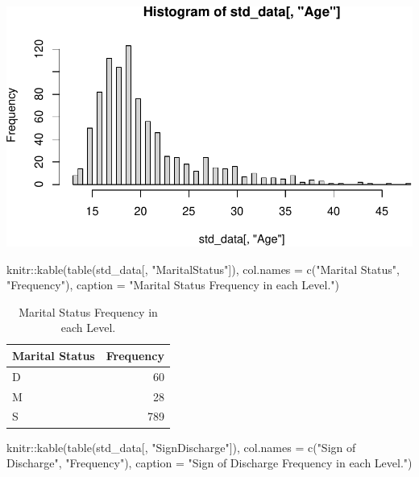 \documentclass[
]{article}
\newenvironment{Shaded}{\begin{snugshade}}{\end{snugshade}}
\newcommand{\AttributeTok}[1]{\textcolor[rgb]{0.77,0.63,0.00}{#1}}
\newcommand{\FunctionTok}[1]{\textcolor[rgb]{0.00,0.00,0.00}{#1}}
\newcommand{\NormalTok}[1]{#1}
\newcommand{\SpecialCharTok}[1]{\textcolor[rgb]{0.00,0.00,0.00}{#1}}
\newcommand{\StringTok}[1]{\textcolor[rgb]{0.31,0.60,0.02}{#1}}
\begin{document}
\includegraphics{practical_files/figure-latex/unnamed-chunk-4-1.pdf}

\begin{Shaded}
\begin{Highlighting}[]
\NormalTok{knitr}\SpecialCharTok{::}\FunctionTok{kable}\NormalTok{(}\FunctionTok{table}\NormalTok{(std\_data[, }\StringTok{"MaritalStatus"}\NormalTok{]), }\AttributeTok{col.names =} \FunctionTok{c}\NormalTok{(}\StringTok{"Marital Status"}\NormalTok{, }\StringTok{"Frequency"}\NormalTok{), }\AttributeTok{caption =} \StringTok{"Marital Status Frequency in each Level."}\NormalTok{)}
\end{Highlighting}
\end{Shaded}

\begin{table}

\caption{\label{tab:unnamed-chunk-5}Marital Status Frequency in each Level.}
\centering
\begin{tabular}[t]{l|r}
\hline
Marital Status & Frequency\\
\hline
D & 60\\
\hline
M & 28\\
\hline
S & 789\\
\hline
\end{tabular}
\end{table}

\begin{Shaded}
\begin{Highlighting}[]
\NormalTok{knitr}\SpecialCharTok{::}\FunctionTok{kable}\NormalTok{(}\FunctionTok{table}\NormalTok{(std\_data[, }\StringTok{"SignDischarge"}\NormalTok{]), }\AttributeTok{col.names =} \FunctionTok{c}\NormalTok{(}\StringTok{"Sign of Discharge"}\NormalTok{, }\StringTok{"Frequency"}\NormalTok{), }\AttributeTok{caption =} \StringTok{"Sign of Discharge Frequency in each Level."}\NormalTok{)}
\end{Highlighting}
\end{Shaded}
\end{document}
